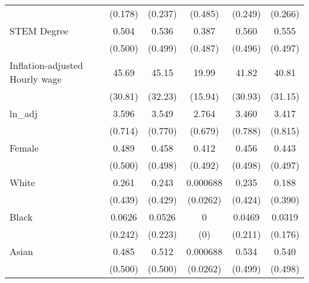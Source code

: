 \begin{table}[htbp]
\begin{tabular}{l*{5}{c}}
                    &     (0.178)         &     (0.237)         &     (0.485)         &     (0.249)         &     (0.266)         \\
[1em]
STEM Degree         &       0.504         &       0.536         &       0.387         &       0.560         &       0.555         \\
                    &     (0.500)         &     (0.499)         &     (0.487)         &     (0.496)         &     (0.497)         \\
[1em]
Inflation-adjusted Hourly wage&       45.69         &       45.15         &       19.99         &       41.82         &       40.81         \\
                    &     (30.81)         &     (32.23)         &     (15.94)         &     (30.93)         &     (31.15)         \\
[1em]
ln\_adj              &       3.596         &       3.549         &       2.764         &       3.460         &       3.417         \\
                    &     (0.714)         &     (0.770)         &     (0.679)         &     (0.788)         &     (0.815)         \\
[1em]
Female              &       0.489         &       0.458         &       0.412         &       0.456         &       0.443         \\
                    &     (0.500)         &     (0.498)         &     (0.492)         &     (0.498)         &     (0.497)         \\
[1em]
White               &       0.261         &       0.243         &    0.000688         &       0.235         &       0.188         \\
                    &     (0.439)         &     (0.429)         &    (0.0262)         &     (0.424)         &     (0.390)         \\
[1em]
Black               &      0.0626         &      0.0526         &           0         &      0.0469         &      0.0319         \\
                    &     (0.242)         &     (0.223)         &         (0)         &     (0.211)         &     (0.176)         \\
[1em]
Asian               &       0.485         &       0.512         &    0.000688         &       0.534         &       0.540         \\
                    &     (0.500)         &     (0.500)         &    (0.0262)         &     (0.499)         &     (0.498)         \\

\end{tabular}
\end{table}
